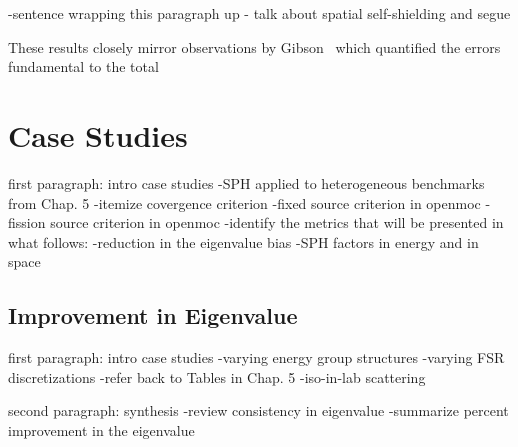 -sentence wrapping this paragraph up - talk about spatial self-shielding and segue

These results closely mirror observations by Gibson~\cite{gibson2016thesis} which quantified the errors fundamental to the total 


\section{Case Studies}
\label{sec:chap5-sph-case-studies}

first paragraph: intro case studies
-SPH applied to heterogeneous benchmarks from Chap. 5
-itemize covergence criterion
-fixed source criterion in openmoc
-fission source criterion in openmoc
-identify the metrics that will be presented in what follows:
  -reduction in the eigenvalue bias
  -SPH factors in energy and in space

\subsection{Improvement in Eigenvalue}
\label{subsubsec:chap5-sph-eigenvalues}

first paragraph: intro case studies
-varying energy group structures
-varying \ac{FSR} discretizations
-refer back to Tables in Chap. 5
-iso-in-lab scattering

second paragraph: synthesis
-review consistency in eigenvalue
-summarize percent improvement in the eigenvalue

